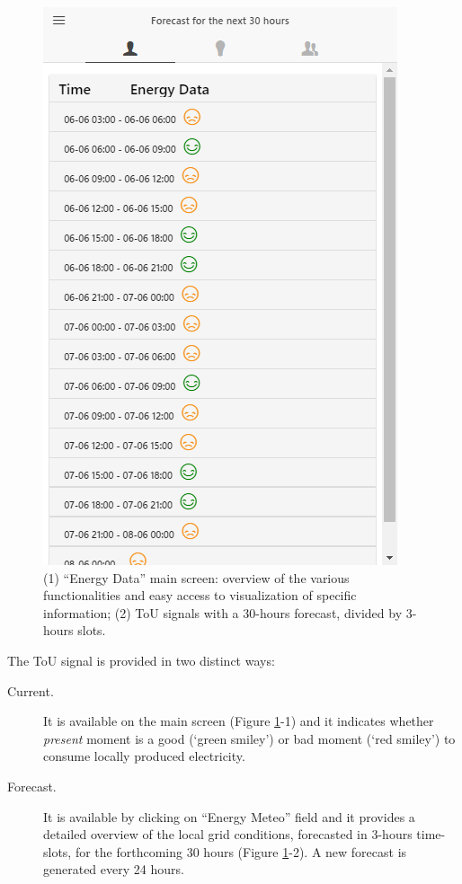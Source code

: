 \begin{figure}[htb]
\begin{center}
\begin{minipage}[htb]{0.45\linewidth}
         \includegraphics[width=1\linewidth]{img/touprediction.png}   
        \end{minipage}
      \end{center}
      \caption{(1) ``Energy Data'' main screen: overview of the various functionalities and easy access to visualization of specific information;
(2) ToU signals with a 30-hours forecast, divided by 3-hours slots.}\label{fig:overview-tou}
\end{figure}

The ToU signal is provided in two distinct ways:
\begin{description}
 \item[Current.] It is available on the main screen (Figure \ref{fig:overview-tou}-1) and it indicates whether \textit{present} moment is a good (`green smiley') or bad moment (`red smiley')
 to consume locally produced electricity.
 \item[Forecast.] It is available by clicking on ``Energy Meteo'' field and it provides a detailed overview of the local grid conditions, forecasted in 3-hours time-slots, for the forthcoming 30 hours (Figure \ref{fig:overview-tou}-2). A new forecast is generated every 24 hours.
\end{description}




